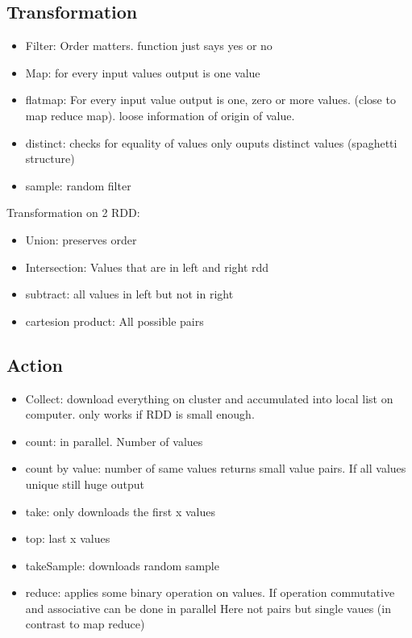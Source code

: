 \subsection{Transformation}
\begin{itemize}
    \item Filter: Order matters. function just says yes or no
    \item Map: for every input values output is one value
    \item flatmap: For every input value output is one, zero or more values. (close to map reduce map). loose information
    of origin of value.
    \item distinct: checks for equality of values only ouputs distinct values (spaghetti structure)
    \item sample: random filter
\end{itemize}
Transformation on 2 RDD:
\begin{itemize}
    \item Union: preserves order
    \item Intersection: Values that are in left and right rdd
    \item subtract: all values in left but not in right
    \item cartesion product: All possible pairs
\end{itemize}



\subsection{Action}
\begin{itemize}
    \item Collect: download everything on cluster and accumulated into local list on computer. only works
    if RDD is small enough.
    \item count: in parallel. Number of values
    \item count by value: number of same values returns small value pairs. If all values unique still huge output
    \item take: only downloads the first x values
    \item top: last x values
    \item takeSample: downloads random sample
    \item reduce: applies some binary operation on values. If operation commutative and associative can be done in parallel
    Here not pairs but single vaues (in contrast to map reduce)
\end{itemize}

